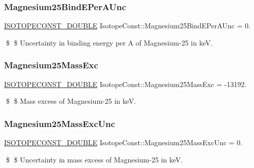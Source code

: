 \subsubsection{\texorpdfstring{Magnesium25\+Bind\+E\+Per\+A\+Unc}{Magnesium25BindEPerAUnc}}
{\footnotesize\ttfamily \mbox{\hyperlink{group___isotope_const-_macros_ga8f45a7272ce02c0b4c65c44636ed719a}{I\+S\+O\+T\+O\+P\+E\+C\+O\+N\+S\+T\+\_\+\+D\+O\+U\+B\+LE}} Isotope\+Const\+::\+Magnesium25\+Bind\+E\+Per\+A\+Unc = 0.}

\$ \$ Uncertainty in binding energy per A of Magnesium-\/25 in keV. \mbox{\label{group___isotope_const-_magnesium-_mg25_ga8ac92f1d6e5223beff08888c7dd73e74}} 
\subsubsection{\texorpdfstring{Magnesium25\+Mass\+Exc}{Magnesium25MassExc}}
{\footnotesize\ttfamily \mbox{\hyperlink{group___isotope_const-_macros_ga8f45a7272ce02c0b4c65c44636ed719a}{I\+S\+O\+T\+O\+P\+E\+C\+O\+N\+S\+T\+\_\+\+D\+O\+U\+B\+LE}} Isotope\+Const\+::\+Magnesium25\+Mass\+Exc = -\/13192.}

\$ \$ Mass excess of Magnesium-\/25 in keV. \mbox{\label{group___isotope_const-_magnesium-_mg25_ga63c74173b6e2cfdaa519d101df88bdb7}} 
\subsubsection{\texorpdfstring{Magnesium25\+Mass\+Exc\+Unc}{Magnesium25MassExcUnc}}
{\footnotesize\ttfamily \mbox{\hyperlink{group___isotope_const-_macros_ga8f45a7272ce02c0b4c65c44636ed719a}{I\+S\+O\+T\+O\+P\+E\+C\+O\+N\+S\+T\+\_\+\+D\+O\+U\+B\+LE}} Isotope\+Const\+::\+Magnesium25\+Mass\+Exc\+Unc = 0.}

\$ \$ Uncertainty in mass excess of Magnesium-\/25 in keV. \mbox{\label{group___isotope_const-_magnesium-_mg25_gae8bea2f28a317ec80c54e76130a35c78}} 
